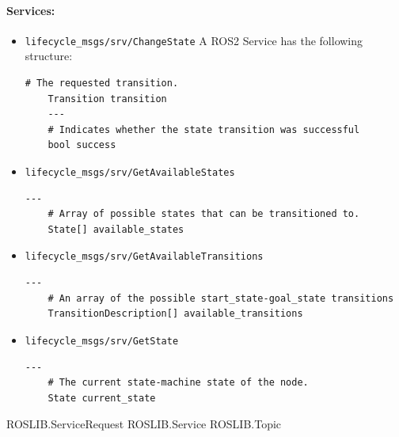 \paragraph{Services:}

\begin{itemize}
	\item \lstinline{lifecycle_msgs/srv/ChangeState}
A ROS2 Service has the following structure:
\begin{lstlisting}[language=service,
	caption={Service definition ChangeState},
	label={code:ROS:Service definition ChangeState}]
	# The requested transition.
	Transition transition
	---
	# Indicates whether the state transition was successful
	bool success
\end{lstlisting}



\item \lstinline{lifecycle_msgs/srv/GetAvailableStates}
\begin{lstlisting}[language=service,
	caption={Service definition GetAvailableStates},
	label={code:ROS:Service definition GetAvailableStates}]
	---
	# Array of possible states that can be transitioned to.
	State[] available_states
\end{lstlisting}

\item \lstinline{lifecycle_msgs/srv/GetAvailableTransitions}
\begin{lstlisting}[language=service,
	caption={Service definition GetAvailableTransitions},
	label={code:ROS:Service definition GetAvailableTransitions}]
	---
	# An array of the possible start_state-goal_state transitions
	TransitionDescription[] available_transitions

\end{lstlisting}

\item \lstinline{lifecycle_msgs/srv/GetState}
\begin{lstlisting}[language=service,
	caption={Service definition GetState},
	label={code:ROS:Service definition GetState}]
	---
	# The current state-machine state of the node.
	State current_state
\end{lstlisting}

\end{itemize}



ROSLIB.ServiceRequest
ROSLIB.Service
ROSLIB.Topic


